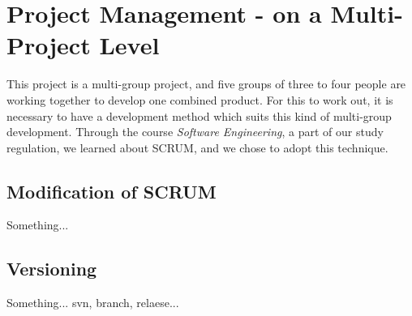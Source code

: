 \chapter{Project Management - on a Multi-Project Level}
\label{cha:project_management}

This project is a multi-group project, and five groups of three to four people are working together to develop one combined product. For this to work out, it is necessary to have a development method which suits this kind of multi-group development. Through the course \textit{Software Engineering}, a part of our study regulation, we learned about SCRUM, and we chose to adopt this technique.

\section{Modification of SCRUM}
Something...

\section{Versioning}
Something... svn, branch, relaese...